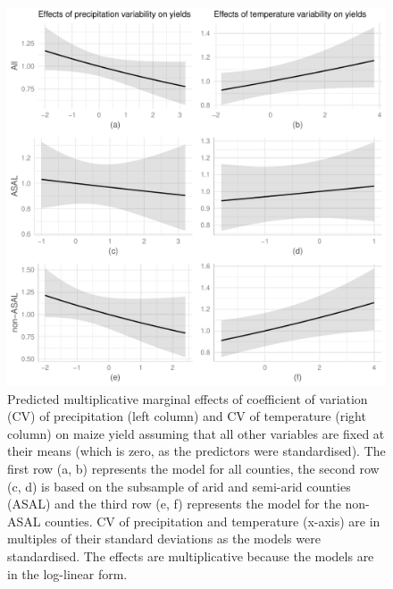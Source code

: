 \documentclass[12pt]{iopart}
\begin{document}
{  \begin{figure}
   \includegraphics{Figure2a_2f.pdf}
\caption{Predicted multiplicative marginal effects of coefficient of variation (CV) of precipitation (left column) and CV of temperature (right column) on maize yield assuming that all other variables are fixed at their means (which is zero, as the predictors were standardised). The first row (a, b) represents the model for all counties, the second row (c, d) is based on the subsample of arid and semi-arid counties (ASAL) and the third row (e, f) represents the model for the non-ASAL counties. CV of precipitation and temperature (x-axis) are in multiples of their standard deviations as the models were standardised. The effects are multiplicative because the models are in the log-linear form.}\label{MarEff2}
\end{figure}

}
\end{document}
